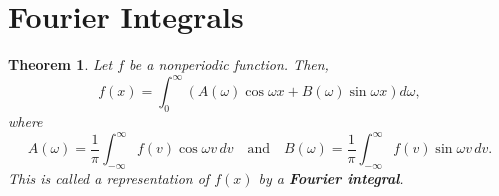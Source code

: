 \documentclass[12pt,openany]{book}
\newtheorem{theorem}{Theorem}[chapter]
\theoremstyle{definition}
\begin{document}
	\section{Fourier Integrals}
	\begin{tcolorbox}[colframe=thmcolor, title={\color{white}\bf Fourier Integral}]
		\begin{theorem}
			Let \( f \) be a nonperiodic function. Then,
			\[
			f(x) = \int_{0}^{\infty} \left( A(\omega) \cos \omega x + B(\omega) \sin \omega x \right) d\omega,
			\]
			where
			\[
			A(\omega) = \frac{1}{\pi} \int_{-\infty}^{\infty} f(v) \cos \omega v \, dv \quad \text{and} \quad B(\omega) = \frac{1}{\pi} \int_{-\infty}^{\infty} f(v) \sin \omega v \, dv.
			\]
			This is called a representation of \( f(x) \) by a \textbf{Fourier integral}.
		\end{theorem}
	\end{tcolorbox}
\end{document}
